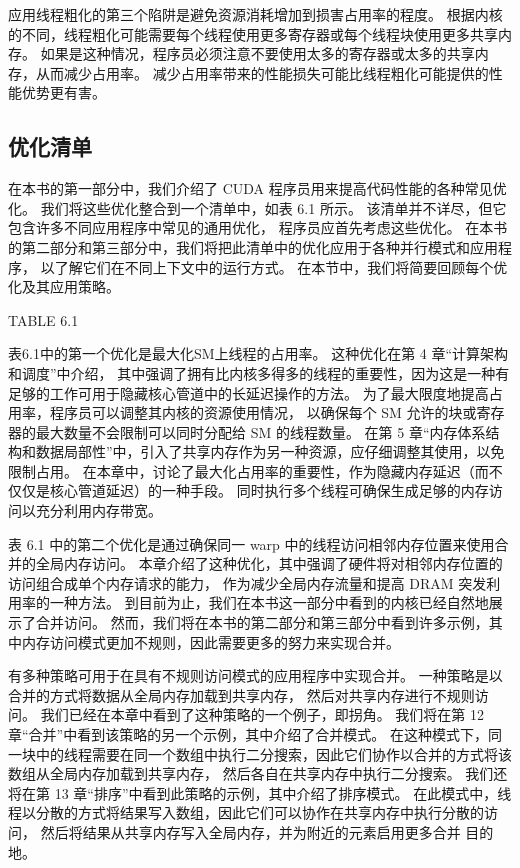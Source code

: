 应用线程粗化的第三个陷阱是避免资源消耗增加到损害占用率的程度。 
根据内核的不同，线程粗化可能需要每个线程使用更多寄存器或每个线程块使用更多共享内存。 
如果是这种情况，程序员必须注意不要使用太多的寄存器或太多的共享内存，从而减少占用率。 
减少占用率带来的性能损失可能比线程粗化可能提供的性能优势更有害。

\subsection{优化清单}
在本书的第一部分中，我们介绍了 CUDA 程序员用来提高代码性能的各种常见优化。 
我们将这些优化整合到一个清单中，如表 6.1 所示。 该清单并不详尽，但它包含许多不同应用程序中常见的通用优化，
程序员应首先考虑这些优化。 在本书的第二部分和第三部分中，我们将把此清单中的优化应用于各种并行模式和应用程序，
以了解它们在不同上下文中的运行方式。 在本节中，我们将简要回顾每个优化及其应用策略。

{\color{red} TABLE 6.1}

表6.1中的第一个优化是最大化SM上线程的占用率。 这种优化在第 4 章“计算架构和调度”中介绍，
其中强调了拥有比内核多得多的线程的重要性，因为这是一种有足够的工作可用于隐藏核心管道中的长延迟操作的方法。 
为了最大限度地提高占用率，程序员可以调整其内核的资源使用情况，
以确保每个 SM 允许的块或寄存器的最大数量不会限制可以同时分配给 SM 的线程数量。 
在第 5 章“内存体系结构和数据局部性”中，引入了共享内存作为另一种资源，应仔细调整其使用，以免限制占用。 
在本章中，讨论了最大化占用率的重要性，作为隐藏内存延迟（而不仅仅是核心管道延迟）的一种手段。 
同时执行多个线程可确保生成足够的内存访问以充分利用内存带宽。

表 6.1 中的第二个优化是通过确保同一 warp 中的线程访问相邻内存位置来使用合并的全局内存访问。 
本章介绍了这种优化，其中强调了硬件将对相邻内存位置的访问组合成单个内存请求的能力，
作为减少全局内存流量和提高 DRAM 突发利用率的一种方法。 
到目前为止，我们在本书这一部分中看到的内核已经自然地展示了合并访问。 
然而，我们将在本书的第二部分和第三部分中看到许多示例，其中内存访问模式更加不规则，因此需要更多的努力来实现合并。

有多种策略可用于在具有不规则访问模式的应用程序中实现合并。 一种策略是以合并的方式将数据从全局内存加载到共享内存，
然后对共享内存进行不规则访问。 我们已经在本章中看到了这种策略的一个例子，即拐角。 
我们将在第 12 章“合并”中看到该策略的另一个示例，其中介绍了合并模式。 
在这种模式下，同一块中的线程需要在同一个数组中执行二分搜索，因此它们协作以合并的方式将该数组从全局内存加载到共享内存，
然后各自在共享内存中执行二分搜索。 我们还将在第 13 章“排序”中看到此策略的示例，其中介绍了排序模式。 
在此模式中，线程以分散的方式将结果写入数组，因此它们可以协作在共享内存中执行分散的访问，
然后将结果从共享内存写入全局内存，并为附近的元素启用更多合并 目的地。

